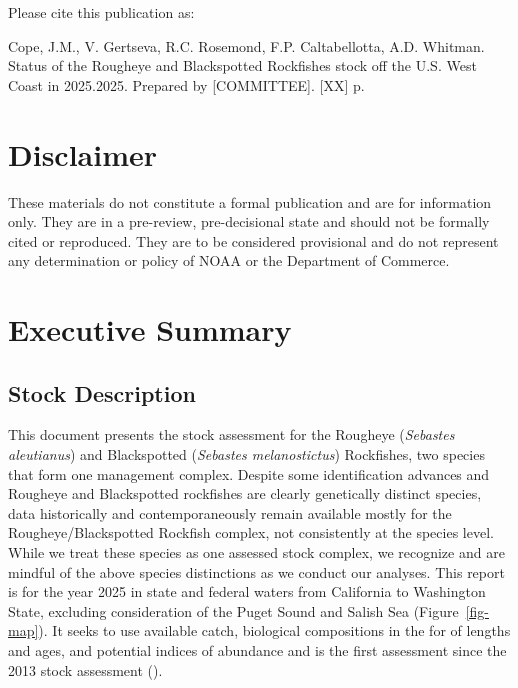 \documentclass[
]{scrartcl}
\renewcommand*\contentsname{Table of contents}
\newcommand\contentsname{Table of contents}
\begin{document}
\renewcommand*\contentsname{Table of contents}
{
\hypersetup{linkcolor=}
\setcounter{tocdepth}{3}
\tableofcontents
}

\newpage{}

Please cite this publication as:

Cope, J.M., V. Gertseva, R.C. Rosemond, F.P. Caltabellotta, A.D.
Whitman. Status of the Rougheye and Blackspotted Rockfishes stock off
the U.S. West Coast in 2025.2025. Prepared by {[}COMMITTEE{]}. {[}XX{]}
p.

\newpage{}

\section*{Disclaimer}\label{disclaimer}

These materials do not constitute a formal publication and are for
information only. They are in a pre-review, pre-decisional state and
should not be formally cited or reproduced. They are to be considered
provisional and do not represent any determination or policy of NOAA or
the Department of Commerce.

\newpage{}

\section{Executive Summary}\label{executive-summary}

\subsection{Stock Description}\label{stock-description}

This document presents the stock assessment for the Rougheye
(\emph{Sebastes aleutianus}) and Blackspotted (\emph{Sebastes
melanostictus}) Rockfishes, two species that form one management
complex. Despite some identification advances and Rougheye and
Blackspotted rockfishes are clearly genetically distinct species, data
historically and contemporaneously remain available mostly for the
Rougheye/Blackspotted Rockfish complex, not consistently at the species
level. While we treat these species as one assessed stock complex, we
recognize and are mindful of the above species distinctions as we
conduct our analyses. This report is for the year 2025 in state and
federal waters from California to Washington State, excluding
consideration of the Puget Sound and Salish Sea (Figure~\ref{fig-map}).
It seeks to use available catch, biological compositions in the for of
lengths and ages, and potential indices of abundance and is the first
assessment since the 2013 stock assessment
().
\end{document}
